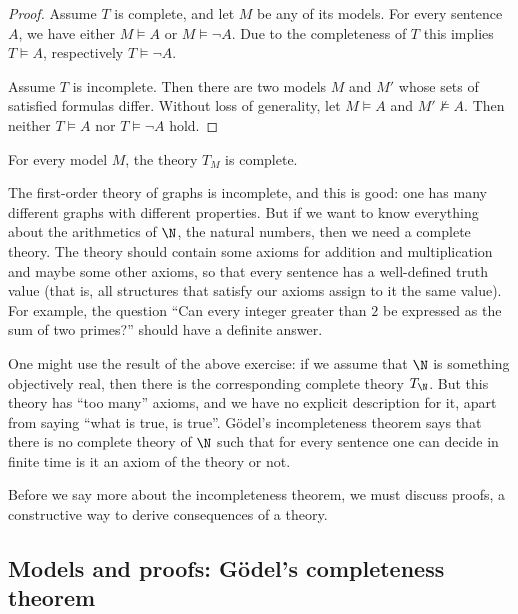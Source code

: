 \begin{page}

\begin{proof}
Assume $T$ is complete, and let $M$ be any of its models.
For every sentence $A$, we have either $M \vDash A$ or $M \vDash \neg A$.
Due to the completeness of $T$ this implies $T \vDash A$, respectively $T \vDash \neg A$.

Assume $T$ is incomplete. Then there are two models $M$ and $M'$ whose sets of satisfied formulas differ.
Without loss of generality, let $M \vDash A$ and $M' \not\vDash A$.
Then neither $T \vDash A$ nor $T \vDash \neg A$ hold.
\end{proof}

\begin{exc}
For every model $M$, the theory $T_M$ is complete.
\end{exc}

The first-order theory of graphs is incomplete, and this is good: one has many different graphs with different properties.
But if we want to know everything about the arithmetics of $\N$, the natural numbers, then we need a complete theory.
The theory should contain some axioms for addition and multiplication and maybe some other axioms,
so that every sentence has a well-defined truth value
(that is, all structures that satisfy our axioms assign to it the same value).
For example, the question ``Can every integer greater than $2$ be expressed as the sum of two primes?'' should have a definite answer.

One might use the result of the above exercise: if we assume that $\N$ is something objectively real,
then there is the corresponding complete theory $T_{\N}$.
But this theory has ``too many'' axioms, and we have no explicit description for it, apart from saying ``what is true, is true''.
G\"odel's incompleteness theorem says that there is no complete theory of $\N$
such that for every sentence one can decide in finite time is it an axiom of the theory or not.

Before we say more about the incompleteness theorem, we must discuss proofs, a constructive way to derive consequences of a theory.




\end{page}

\begin{page}

\subsection{Models and proofs: G\"odel's completeness theorem}

\end{page}


